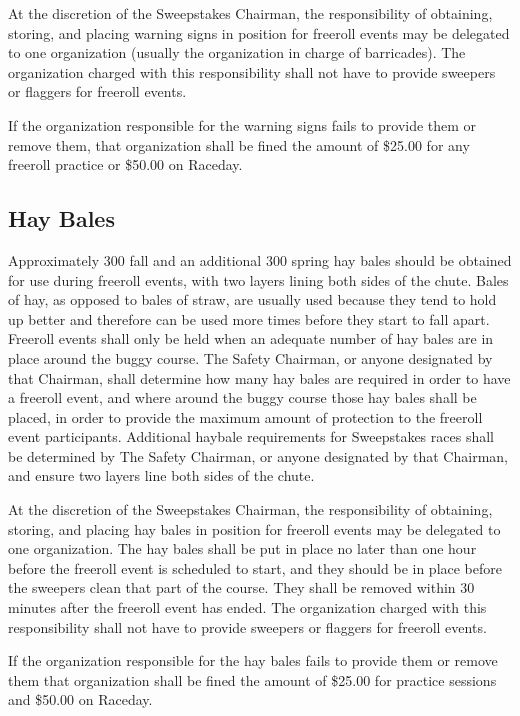 	At the discretion of the Sweepstakes Chairman, the responsibility of obtaining,
	storing, and placing warning signs in position for freeroll events may be
	delegated to one organization (usually the organization in charge of
	barricades). The organization charged with this responsibility shall not have
	to provide sweepers or flaggers for freeroll events.

	If the organization responsible for the warning signs fails to provide them or
	remove them, that organization shall be fined the amount of \$25.00 for any 
	freeroll practice or \$50.00 on Raceday.
	
	
\subsection{Hay Bales}

	Approximately 300 fall and an additional 300 spring hay bales should be 
	obtained for use during freeroll events, with two layers lining both sides 
	of the chute. Bales of hay, as opposed to bales of straw, are usually used 
	because they tend to hold up better and therefore can be used more times before 
	they start to fall apart. Freeroll events shall only be held when an adequate 
	number of hay bales are in place around the buggy course. The Safety Chairman, 
	or anyone designated by that Chairman, shall determine how many hay bales are 
	required in order to have a freeroll event, and where around the buggy course 
	those hay bales shall be placed, in order to provide the maximum amount of 
	protection to the freeroll event participants. Additional haybale requirements 
	for Sweepstakes races shall be determined by The Safety Chairman, or anyone 
	designated by that Chairman, and ensure two layers line both sides of the chute.

	At the discretion of the Sweepstakes Chairman, the responsibility of obtaining,
	storing, and placing hay bales in position for freeroll events may be
	delegated to one organization. The hay bales shall be put in place no later
	than one hour before the freeroll event is scheduled to start, and they
	should be in place before the sweepers clean that part of the course. They
	shall be removed within 30 minutes after the freeroll event has ended. The
	organization charged with this responsibility shall not have to provide
	sweepers or flaggers for freeroll events.

	If the organization responsible for the hay bales fails to provide them or
	remove them that organization shall be fined the amount of \$25.00 for 
	practice sessions and \$50.00 on Raceday.
	

